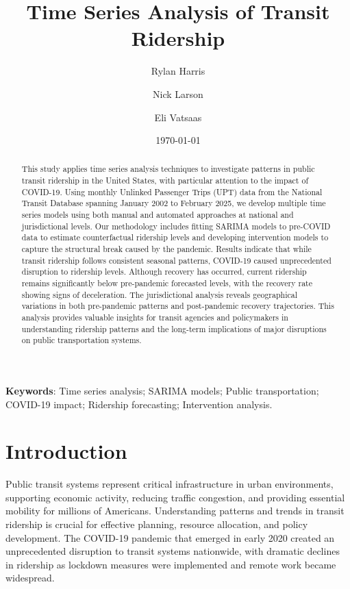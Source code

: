 \documentclass[11pt]{article}
\title{\textbf{Time Series Analysis of Transit Ridership}\vspace{5pt}}
\author[1]{Rylan Harris}
\author[1]{Nick Larson}
\author[1]{Eli Vatsaas}
\affil[1]{Department of Mathematics and Statistics, Northern Arizona University, Flagstaff, AZ 86011, USA}
\date{\today}
\begin{document}

\maketitle

\begin{abstract}
This study applies time series analysis techniques to investigate patterns in public transit ridership in the United States, with particular attention to the impact of COVID-19. Using monthly Unlinked Passenger Trips (UPT) data from the National Transit Database spanning January 2002 to February 2025, we develop multiple time series models using both manual and automated approaches at national and jurisdictional levels. Our methodology includes fitting SARIMA models to pre-COVID data to estimate counterfactual ridership levels and developing intervention models to capture the structural break caused by the pandemic. Results indicate that while transit ridership follows consistent seasonal patterns, COVID-19 caused unprecedented disruption to ridership levels. Although recovery has occurred, current ridership remains significantly below pre-pandemic forecasted levels, with the recovery rate showing signs of deceleration. The jurisdictional analysis reveals geographical variations in both pre-pandemic patterns and post-pandemic recovery trajectories. This analysis provides valuable insights for transit agencies and policymakers in understanding ridership patterns and the long-term implications of major disruptions on public transportation systems.
\end{abstract}

\vspace{8pt}
\noindent
\textbf{Keywords}: Time series analysis; SARIMA models; Public transportation; COVID-19 impact; Ridership forecasting; Intervention analysis.

\section{Introduction}

Public transit systems represent critical infrastructure in urban environments, supporting economic activity, reducing traffic congestion, and providing essential mobility for millions of Americans. Understanding patterns and trends in transit ridership is crucial for effective planning, resource allocation, and policy development. The COVID-19 pandemic that emerged in early 2020 created an unprecedented disruption to transit systems nationwide, with dramatic declines in ridership as lockdown measures were implemented and remote work became widespread.
\end{document}
